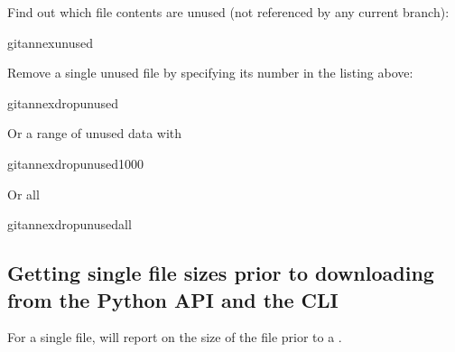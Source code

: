 \sphinxAtStartPar
Find out which file contents are unused (not referenced by any current branch):

\begin{sphinxVerbatim}[commandchars=\\\{\}]
gitannexunused
\end{sphinxVerbatim}

\sphinxAtStartPar
Remove a single unused file by specifying its number in the listing above:

\begin{sphinxVerbatim}[commandchars=\\\{\}]
gitannexdropunused
\end{sphinxVerbatim}

\sphinxAtStartPar
Or a range of unused data with

\begin{sphinxVerbatim}[commandchars=\\\{\}]
gitannexdropunused\PYGZhy{}1000
\end{sphinxVerbatim}

\sphinxAtStartPar
Or all

\begin{sphinxVerbatim}[commandchars=\\\{\}]
gitannexdropunusedall
\end{sphinxVerbatim}


\subsection{Getting single file sizes prior to downloading from the Python API and the CLI}
\label{\detokenize{basics/101-146-gists:getting-single-file-sizes-prior-to-downloading-from-the-python-api-and-the-cli}}
\sphinxAtStartPar
For a single file,  will report on
the size of the file prior to a .

